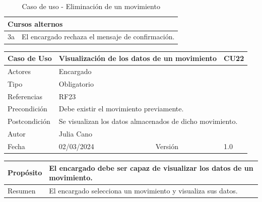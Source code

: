 \begin{table}[H]
	\centering
	\begin{tabular}{| m{} | m{} | m{} | m{} |}
		\hline
		\multicolumn{4}{|m{0.9\textwidth}|}{Cursos alternos}     \\ 
		\hline
		3a & \multicolumn{3}{m{0.67\textwidth}|}{El encargado rechaza el mensaje de confirmación.} \\ 
		\hline
	\end{tabular}
	\caption{Caso de uso - Eliminación de un movimiento}
\end{table}

\newpage



\begin{table}[H]
	\centering
	\begin{tabular}{| m{} | m{} | m{} | m{}|}
		\hline
		\rowcolor{grayshade} Caso de Uso & \multicolumn{2}{|m{0.43\textwidth}|}{Visualización de los datos de un movimiento} &  CU22\\ 
		\hline
		Actores & \multicolumn{3}{l|}{Encargado} \\ 
		\hline
		Tipo & \multicolumn{3}{l|}{Obligatorio} \\ 
		\hline
		Referencias & \multicolumn{3}{l|}{RF23} \\ 
		\hline
		Precondición & \multicolumn{3}{m{0.67\textwidth}|}{Debe existir el movimiento previamente.} \\ 
		\hline
		Postcondición & \multicolumn{3}{m{0.67\textwidth}|}{Se visualizan los datos almacenados de dicho movimiento.} \\ 
		\hline
		Autor & \multicolumn{3}{l|}{Julia Cano} \\ 
		\hline
		Fecha & 02/03/2024 & Versión & 1.0 \\
		\hline
	\end{tabular}
\end{table}

\begin{table}[H]
	\centering
	\begin{tabular}{| m{} | m{} | m{} | m{} |}
		\hline
		Propósito & \multicolumn{3}{m{0.67\textwidth}|}{El encargado debe ser capaz de visualizar los datos de un movimiento.}  \\ 
		\hline
		Resumen & \multicolumn{3}{m{0.67\textwidth}|}{El encargado selecciona un movimiento y visualiza sus datos.} \\ 
		\hline
	\end{tabular}
\end{table}


